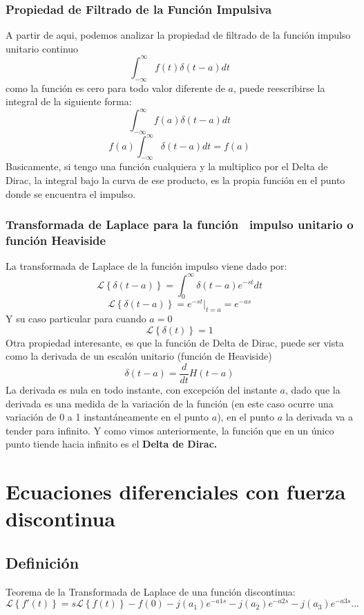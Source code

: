 \documentclass[12pt,a4paper,twoside,onecolumn,openany]{book}
\begin{document}
 \subsection{Propiedad de Filtrado de la Función Impulsiva}
A partir de aqui, podemos analizar la propiedad de filtrado de la función impulso unitario continuo
\[
\int_ { -\infty } ^ { \infty } f(t)\delta(t-a)dt
\]
como la función es cero para todo valor diferente de $a$, puede reescribirse la integral de la siguiente forma:
\[
\int_ { -\infty } ^ { \infty } f(a)\delta(t-a)dt
\]
\[
f(a)\int_ { -\infty } ^ { \infty }\delta(t-a)dt=f(a)
\]
Basicamente, si tengo una función cualquiera y la multiplico por el Delta de Dirac, la integral bajo la curva de ese producto, es la propia función en el punto donde se encuentra el impulso.
\subsection{Transformada de Laplace para la función ~\mbox{impulso} unitario o función Heaviside}
La transformada de Laplace de la función impulso viene dado por:
\[
\mathcal { L } \left\lbrace {\delta(t-a) }\right\rbrace=\int_ { 0 } ^ { \infty }\delta(t-a)e^{-st} dt
\]
\[
\mathcal { L } \left\lbrace {\delta(t-a) }\right\rbrace=e^{-st}\vert_{t=a} = e^{-as}
\]
Y su caso particular para cuando $a=0$
\[
\mathcal { L } \left\lbrace {\delta(t) }\right\rbrace=1
\]
Otra propiedad interesante, es que la función de Delta de Dirac, puede ser vista como la derivada de un escalón unitario (función de Heaviside)
\[
\delta(t-a)=\frac{d}{dt}H(t-a)
\]
La derivada es nula en todo instante, con excepción del instante $a$, dado que la derivada es una medida de la variación de la función (en este caso ocurre una variación de 0 a 1 instantáneamente en el punto $a$), en el punto $a$ la derivada va a tender para infinito. Y como vimos anteriormente, la función que en un único punto tiende hacia infinito es el \textbf{Delta de Dirac.}
\chapter{Ecuaciones diferenciales con fuerza discontinua}
\section{Definición}
Teorema de la Transformada de Laplace de una función discontinua:
\[
\mathcal { L } \left\lbrace {{f'( t )  }}\right\rbrace= s \mathcal { L } \left\lbrace {{f(t)}}\right\rbrace-f(0)-j(a_{1})e^{-a1s}-j(a_{2})e^{-a2s}-j(a_{3})e^{-a3s}...
\]
\end{document}
